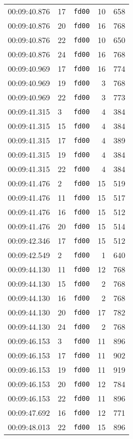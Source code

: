 \documentclass{article}
\begin{document}
\begin{longtable}{lllrr}
00:09:40.876 & 17 & \texttt{fd00} & 10 & 658 \\
00:09:40.876 & 20 & \texttt{fd00} & 16 & 768 \\
00:09:40.876 & 22 & \texttt{fd00} & 10 & 650 \\
00:09:40.876 & 24 & \texttt{fd00} & 16 & 768 \\
00:09:40.969 & 17 & \texttt{fd00} & 16 & 774 \\
00:09:40.969 & 19 & \texttt{fd00} & 3 & 768 \\
00:09:40.969 & 22 & \texttt{fd00} & 3 & 773 \\
00:09:41.315 & 3 & \texttt{fd00} & 4 & 384 \\
00:09:41.315 & 15 & \texttt{fd00} & 4 & 384 \\
00:09:41.315 & 17 & \texttt{fd00} & 4 & 389 \\
00:09:41.315 & 19 & \texttt{fd00} & 4 & 384 \\
00:09:41.315 & 22 & \texttt{fd00} & 4 & 384 \\
00:09:41.476 & 2 & \texttt{fd00} & 15 & 519 \\
00:09:41.476 & 11 & \texttt{fd00} & 15 & 517 \\
00:09:41.476 & 16 & \texttt{fd00} & 15 & 512 \\
00:09:41.476 & 20 & \texttt{fd00} & 15 & 514 \\
00:09:42.346 & 17 & \texttt{fd00} & 15 & 512 \\
00:09:42.549 & 2 & \texttt{fd00} & 1 & 640 \\
00:09:44.130 & 11 & \texttt{fd00} & 12 & 768 \\
00:09:44.130 & 15 & \texttt{fd00} & 2 & 768 \\
00:09:44.130 & 16 & \texttt{fd00} & 2 & 768 \\
00:09:44.130 & 20 & \texttt{fd00} & 17 & 782 \\
00:09:44.130 & 24 & \texttt{fd00} & 2 & 768 \\
00:09:46.153 & 3 & \texttt{fd00} & 11 & 896 \\
00:09:46.153 & 17 & \texttt{fd00} & 11 & 902 \\
00:09:46.153 & 19 & \texttt{fd00} & 11 & 919 \\
00:09:46.153 & 20 & \texttt{fd00} & 12 & 784 \\
00:09:46.153 & 22 & \texttt{fd00} & 11 & 896 \\
00:09:47.692 & 16 & \texttt{fd00} & 12 & 771 \\
00:09:48.013 & 22 & \texttt{fd00} & 15 & 896 \\

\end{longtable}
\end{document}
